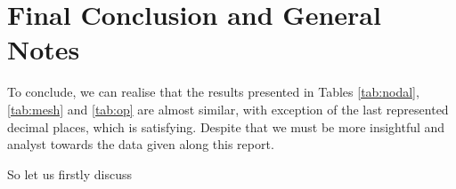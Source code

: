 \section{Final Conclusion and General Notes}
\label{sec:conclusion}

To conclude, we can realise that the results presented in Tables \ref{tab:nodal}, \ref{tab:mesh} and \ref{tab:op} are almost similar, with exception of the last represented decimal places, which is satisfying. Despite that we must be more insightful and analyst towards the data given along this report. \par
So let us firstly discuss 
